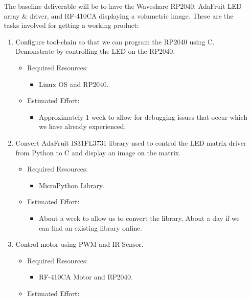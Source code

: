 \documentclass[11pt,journal]{IEEEtran}
\begin{document}
The baseline deliverable will be to have the Waveshare RP2040, AdaFruit LED array \& driver, and RF-410CA displaying a volumetric image. These are the tasks involved for getting a working product:

\begin{enumerate}
    \item Configure tool-chain so that we can program the RP2040 using C. Demonstrate by controlling the LED on the RP2040.
    \begin{itemize}
        \item Required Resources:
        \begin{itemize}
            \item Linux OS and RP2040.
        \end{itemize}
        \item Estimated Effort:
        \begin{itemize}
            \item Approximately 1 week to allow for debugging issues that occur which we have already experienced.
        \end{itemize}
    \end{itemize}
    \item Convert AdaFruit IS31FL3731 library used to control the LED matrix driver from Python to C and display an image on the matrix.
    \begin{itemize}
        \item Required Resources:
        \begin{itemize}
            \item MicroPython Library.
        \end{itemize}
        \item Estimated Effort:
        \begin{itemize}
            \item About a week to allow us to convert the library. About a day if we can find an existing library online. 
        \end{itemize}
    \end{itemize}
    \item Control motor using PWM and IR Sensor.
    \begin{itemize}
        \item Required Resources:
        \begin{itemize}
            \item RF-410CA Motor and RP2040.
        \end{itemize}
        \item Estimated Effort:

\end{itemize}
\end{enumerate}
\end{document}
